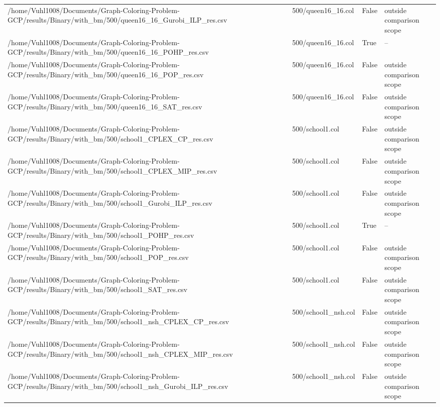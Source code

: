\begin{table}[htbp]
\begin{tabular}{llll}
/home/Vuhl1008/Documents/Graph-Coloring-Problem-GCP/results/Binary/with\_bm/500/queen16\_16\_Gurobi\_ILP\_res.csv & 500/queen16\_16.col & False & outside comparison scope \\
/home/Vuhl1008/Documents/Graph-Coloring-Problem-GCP/results/Binary/with\_bm/500/queen16\_16\_POHP\_res.csv & 500/queen16\_16.col & True & -- \\
/home/Vuhl1008/Documents/Graph-Coloring-Problem-GCP/results/Binary/with\_bm/500/queen16\_16\_POP\_res.csv & 500/queen16\_16.col & False & outside comparison scope \\
/home/Vuhl1008/Documents/Graph-Coloring-Problem-GCP/results/Binary/with\_bm/500/queen16\_16\_SAT\_res.csv & 500/queen16\_16.col & False & outside comparison scope \\
/home/Vuhl1008/Documents/Graph-Coloring-Problem-GCP/results/Binary/with\_bm/500/school1\_CPLEX\_CP\_res.csv & 500/school1.col & False & outside comparison scope \\
/home/Vuhl1008/Documents/Graph-Coloring-Problem-GCP/results/Binary/with\_bm/500/school1\_CPLEX\_MIP\_res.csv & 500/school1.col & False & outside comparison scope \\
/home/Vuhl1008/Documents/Graph-Coloring-Problem-GCP/results/Binary/with\_bm/500/school1\_Gurobi\_ILP\_res.csv & 500/school1.col & False & outside comparison scope \\
/home/Vuhl1008/Documents/Graph-Coloring-Problem-GCP/results/Binary/with\_bm/500/school1\_POHP\_res.csv & 500/school1.col & True & -- \\
/home/Vuhl1008/Documents/Graph-Coloring-Problem-GCP/results/Binary/with\_bm/500/school1\_POP\_res.csv & 500/school1.col & False & outside comparison scope \\
/home/Vuhl1008/Documents/Graph-Coloring-Problem-GCP/results/Binary/with\_bm/500/school1\_SAT\_res.csv & 500/school1.col & False & outside comparison scope \\
/home/Vuhl1008/Documents/Graph-Coloring-Problem-GCP/results/Binary/with\_bm/500/school1\_nsh\_CPLEX\_CP\_res.csv & 500/school1\_nsh.col & False & outside comparison scope \\
/home/Vuhl1008/Documents/Graph-Coloring-Problem-GCP/results/Binary/with\_bm/500/school1\_nsh\_CPLEX\_MIP\_res.csv & 500/school1\_nsh.col & False & outside comparison scope \\
/home/Vuhl1008/Documents/Graph-Coloring-Problem-GCP/results/Binary/with\_bm/500/school1\_nsh\_Gurobi\_ILP\_res.csv & 500/school1\_nsh.col & False & outside comparison scope \\

\end{tabular}
\end{table}
